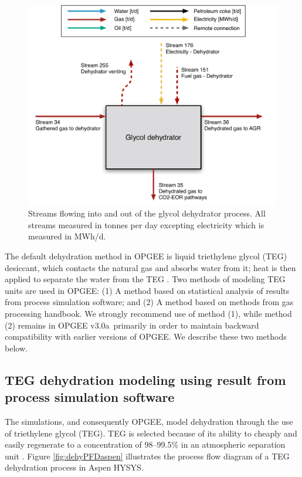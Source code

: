 \documentclass[11pt]{report}
\newcommand{\version}{v3.0a}
\begin{document}
\begin{figure}
\includegraphics[width=0.85\columnwidth]{images/glycol_dehydrator_PF.pdf}
\caption{Streams flowing into and out of the glycol dehydrator process. All streams measured in tonnes per day excepting electricity which is measured in MWh/d.}
\label{fig:glycol_dehydrator_PF}
\end{figure}


The default dehydration method in OPGEE is liquid triethylene glycol (TEG) desiccant, which contacts the natural gas and absorbs water from it; heat is then applied to separate the water from the TEG \cite[p. 140]{Manning1991}. Two methods of modeling TEG units are used in OPGEE: (1) A method based on statistical analysis of results from process simulation software; and (2) A method based on methods from gas processing handbook. We strongly recommend use of method (1), while method (2) remains in OPGEE \version \, primarily in order to maintain backward compatibility with earlier versions of OPGEE.  We describe these two methods below.

\subsection{TEG dehydration modeling using result from process simulation software}

The simulations, and consequently OPGEE, model dehydration through the use of triethylene glycol (TEG). TEG is selected because of its ability to cheaply and easily regenerate to a concentration of 98--99.5\% in an atmospheric separation unit \cite{Manning1991}. Figure \ref{fig:dehyPFDaspen} illustrates the process flow diagram of a TEG dehydration process in Aspen HYSYS.
\end{document}
